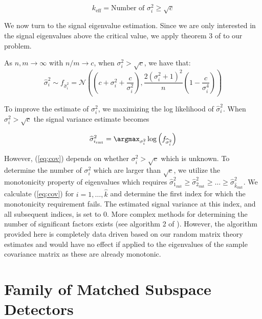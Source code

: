 \begin{equation}
\boxed{k_\text{eff} = \text{Number of } \sigma_i^2\geq\sqrt{c}}
\end{equation}

We now turn to the signal eigenvalue estimation. Since we are only interested in the signal eigenvalues above the critical value, we apply theorem 3 of \cite{paul2007asymptotics} to our problem.

\begin{Th}\label{th:eigenvalues}
As $n,m \longrightarrow \infty$ with $n/m \to c$, when $\sigma_i^2 > \sqrt{c}$, we have that:
\begin{equation*}
\widehat{\sigma}_i^2\sim f_{\widehat{\sigma}_i^2}=\mathcal{N}\left(\left(c+\sigma_i^2+\frac{c}{\sigma_i^2}\right),\frac{2\left(\sigma_i^2+1\right)^2}{n}\left(1-\frac{c}{\sigma_i^4}\right)\right)
\end{equation*}
\end{Th}

To improve the estimate of $\sigma_i^2$, we maximizing the log likelihood of $\widehat{\sigma}_i^2$. When $\sigma_i^2 > \sqrt{c}$ the signal variance estimate becomes

\begin{equation}\label{eq:cov}
\widehat{\sigma}^2_{i_\text{rmt}} = \argmax_{\sigma_i^2} \log\left(f_{\widehat{\sigma}_i^2}\right)
\end{equation}

However, (\ref{eq:cov}) depends on whether $\sigma_i^2 > \sqrt{c}$ which is unknown. To determine the number of $\sigma_i^2$ which are larger than $\sqrt{c}$, we utilize the monotonicity property of eigenvalues which requires $\widehat{\sigma}^2_{1_\text{rmt}}\geq \widehat{\sigma}^2_{2_\text{rmt}}\geq\dots\geq\widehat{\sigma}^2_{\widehat{k}_\text{rmt}}$. We calculate (\ref{eq:cov}) for $i=1,\dots,\widehat{k}$ and determine the first index for which the monotonicity requirement fails. The estimated signal variance at this index, and all subsequent indices, is set to 0. More complex methods for determining the number of significant factors exists (see algorithm 2 of \cite{nadakuditi2010fundamental}). However, the algorithm provided here is completely data driven based on our random matrix theory estimates and would have no effect if applied to the eigenvalues of the sample covariance matrix as these are already monotonic.

\section{Family of Matched Subspace Detectors}\label{sec:detectors}

